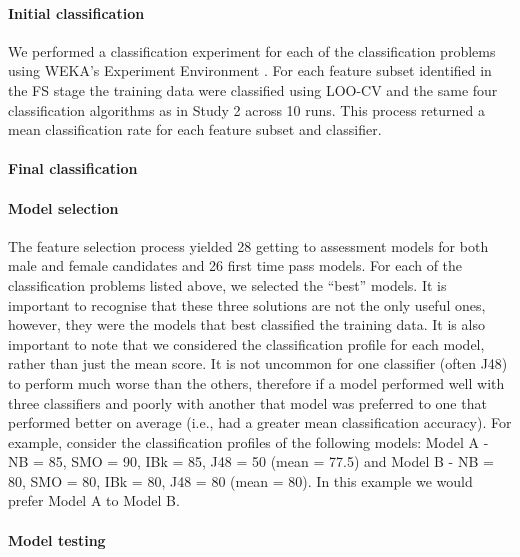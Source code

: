 \documentclass[a4paper,]{book}
\let\oldparagraph\paragraph
\renewcommand{\paragraph}[1]{\oldparagraph{#1}\mbox{}}
\begin{document}
\hypertarget{initial-classification}{%
\paragraph{Initial classification}\label{initial-classification}}

We performed a classification experiment for each of the classification problems using WEKA's Experiment Environment \citep{Bouckaert2018, Frank2016}. For each feature subset identified in the FS stage the training data were classified using LOO-CV and the same four classification algorithms as in Study 2 across 10 runs. This process returned a mean classification rate for each feature subset and classifier.

\hypertarget{final-classification}{%
\paragraph{Final classification}\label{final-classification}}

\hypertarget{model-selection}{%
\paragraph{Model selection}\label{model-selection}}

The feature selection process yielded 28 getting to assessment models for both male and female candidates and 26 first time pass models. For each of the classification problems listed above, we selected the ``best'' models. It is important to recognise that these three solutions are not the only useful ones, however, they were the models that best classified the training data. It is also important to note that we considered the classification profile for each model, rather than just the mean score. It is not uncommon for one classifier (often J48) to perform much worse than the others, therefore if a model performed well with three classifiers and poorly with another that model was preferred to one that performed better on average (i.e., had a greater mean classification accuracy). For example, consider the classification profiles of the following models: Model A - NB = 85, SMO = 90, IBk = 85, J48 = 50 (mean = 77.5) and Model B - NB = 80, SMO = 80, IBk = 80, J48 = 80 (mean = 80). In this example we would prefer Model A to Model B.

\hypertarget{model-testing}{%
\paragraph{Model testing}\label{model-testing}}
\end{document}
